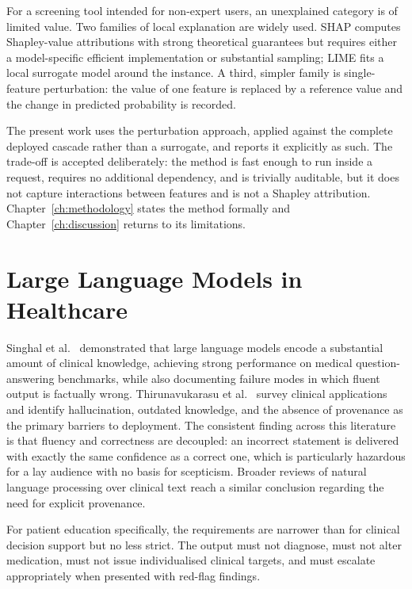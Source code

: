 For a screening tool intended for non-expert users, an unexplained category is
of limited value. Two families of local explanation are widely used. SHAP
\cite{lundberg2017} computes Shapley-value attributions with strong theoretical
guarantees but requires either a model-specific efficient implementation or
substantial sampling; LIME \cite{ribeiro2016} fits a local surrogate model
around the instance. A third, simpler family is single-feature perturbation: the
value of one feature is replaced by a reference value and the change in
predicted probability is recorded.

The present work uses the perturbation approach, applied against the complete
deployed cascade rather than a surrogate, and reports it explicitly as such.
The trade-off is accepted deliberately: the method is fast enough to run inside
a request, requires no additional dependency, and is trivially auditable, but it
does not capture interactions between features and is not a Shapley
attribution. Chapter~\ref{ch:methodology} states the method formally and
Chapter~\ref{ch:discussion} returns to its limitations.

\section{Large Language Models in Healthcare}
\label{sec:llm_health}

Singhal et al.\ \cite{singhal2023} demonstrated that large language models
encode a substantial amount of clinical knowledge, achieving strong performance
on medical question-answering benchmarks, while also documenting failure modes
in which fluent output is factually wrong. Thirunavukarasu et al.\
\cite{thirunavukarasu2023} survey clinical applications and identify
hallucination, outdated knowledge, and the absence of provenance as the primary
barriers to deployment. The consistent finding across this literature is that
fluency and correctness are decoupled: an incorrect statement is delivered with
exactly the same confidence as a correct one, which is particularly hazardous
for a lay audience with no basis for scepticism. Broader reviews of natural
language processing over clinical text \cite{li2022nlp} reach a similar
conclusion regarding the need for explicit provenance.

For patient education specifically, the requirements are narrower than for
clinical decision support but no less strict. The output must not diagnose,
must not alter medication, must not issue individualised clinical targets, and
must escalate appropriately when presented with red-flag findings.

